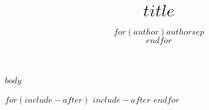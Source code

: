 \documentclass[oneside,11pt,parskip=half,ngerman]{scrreprt}
\title{\bigskip \bigskip $title$}
\author{$for(author)$$author$$sep$\\$endfor$}
\begin{document}
  
\maketitle

$body$

$for(include-after)$
$include-after$
$endfor$
\end{document}
